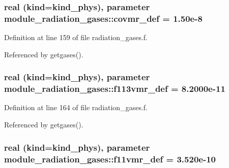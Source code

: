 \subsubsection[{\texorpdfstring{covmr\+\_\+def}{covmr_def}}]{\setlength{\rightskip}{0pt plus 5cm}real (kind=kind\+\_\+phys), parameter module\+\_\+radiation\+\_\+gases\+::covmr\+\_\+def = 1.\+50e-\/8\hspace{0.3cm}{\ttfamily [private]}}\hypertarget{group__module__radiation__gases_ga3554bdf03f8222d425bb6c946244cbb5}{}\label{group__module__radiation__gases_ga3554bdf03f8222d425bb6c946244cbb5}


Definition at line 159 of file radiation\+\_\+gases.\+f.



Referenced by getgases().

\subsubsection[{\texorpdfstring{f113vmr\+\_\+def}{f113vmr_def}}]{\setlength{\rightskip}{0pt plus 5cm}real (kind=kind\+\_\+phys), parameter module\+\_\+radiation\+\_\+gases\+::f113vmr\+\_\+def = 8.\+2000e-\/11\hspace{0.3cm}{\ttfamily [private]}}\hypertarget{group__module__radiation__gases_ga76ec88dc6284c48cfaae6cd05428b6dd}{}\label{group__module__radiation__gases_ga76ec88dc6284c48cfaae6cd05428b6dd}


Definition at line 164 of file radiation\+\_\+gases.\+f.



Referenced by getgases().

\subsubsection[{\texorpdfstring{f11vmr\+\_\+def}{f11vmr_def}}]{\setlength{\rightskip}{0pt plus 5cm}real (kind=kind\+\_\+phys), parameter module\+\_\+radiation\+\_\+gases\+::f11vmr\+\_\+def = 3.\+520e-\/10\hspace{0.3cm}{\ttfamily [private]}}\hypertarget{group__module__radiation__gases_ga23ae6bb6860bfefef0c281b7106f521e}{}\label{group__module__radiation__gases_ga23ae6bb6860bfefef0c281b7106f521e}


